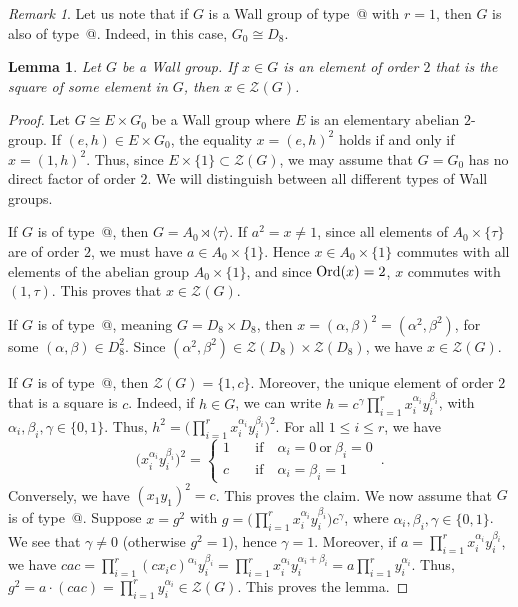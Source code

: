 \documentclass[12pt]{amsart}
\makeatletter
\numberwithin{equation}{section}
\newcommand*{\rom}[1]{\expandafter\@slowromancap\romannumeral #1@}
\newcommand{\Ord}{{\rm Ord}}
\newtheorem{lem}[X]{Lemma}
\theoremstyle{definition}
\theoremstyle{remark}
\newtheorem{rk}{Remark}[section]
\makeatother
\begin{document}
    \begin{rk}
        Let us note that if $G$ is a Wall group of type~\rom{4} with $r=1$, then $G$ is also of type~\rom{1}. Indeed, in this case, $G_0\cong D_8$.
    \end{rk}
    \begin{lem}\label{Wallcentralelement}
        Let $G$ be a Wall group. If $x\in G$ is an element of order $2$ that is the square of some element in $G$, then $x\in \mathcal{Z}(G)$.
    \end{lem}
    \begin{proof}
        Let $G\cong E\times G_0$ be a Wall group where $E$ is an elementary abelian $2$-group. If $(e,h)\in E\times G_0$, the equality $x=(e,h)^2$ holds if and only if $x=(1,h)^2$. Thus, since $E\times \{1\}\subset \mathcal{Z}(G)$, we may assume that $G=G_0$ has no direct factor of order $2$. We will distinguish between all different types of Wall groups.
        
        If $G$ is of type~\rom{1}, then $G=A_0\rtimes\langle \tau\rangle$. If $a^2=x\ne 1$, since all elements of $A_0\times\{\tau\}$ are of order $2$, we must have $a\in A_0\times\{1\}$. Hence $x\in A_0\times\{1\}$ commutes with all elements of the abelian group $A_0\times\{1\}$, and since $\Ord(x)=2$, $x$ commutes with $(1,\tau)$. This proves that $x\in \mathcal{Z}(G)$.
        
        If $G$ is of type~\rom{2}, meaning $G=D_8\times D_8$, then $x=(\alpha,\beta)^2=(\alpha^2,\beta^2)$, for some $(\alpha,\beta)\in D_8^2$. Since $(\alpha^2,\beta^2)\in \mathcal{Z}(D_8)\times\mathcal{Z}(D_8)$, we have $x\in \mathcal{Z}(G)$.
        
        If $G$ is of type~\rom{3}, then $\mathcal{Z}(G)=\{1,c\}$. Moreover, the unique element of order $2$ that is a square is $c$. Indeed, if $h\in G$, we can write $h=c^\gamma\prod_{i=1}^r x_i^{\alpha_i}y_i^{\beta_i}$, with $\alpha_i,\beta_i,\gamma\in \{0,1\}$. Thus, $h^2=\bigl(\prod_{i=1}^r x_i^{\alpha_i}y_i^{\beta_i}\bigr)^2$. For all $1\le i\le r$, we have \[\bigl(x_i^{\alpha_i} y_i^{\beta_i}\bigr)^2=\begin{cases}
            1\quad &\text{if}\quad \alpha_i=0\ \text{or}\ \beta_i=0\\
            c   &\text{if}\quad \alpha_i=\beta_i=1
        \end{cases}\, .\]
        Conversely, we have $(x_1y_1)^2=c$. This proves the claim. We now assume that $G$ is of type~\rom{4}. Suppose $x=g^2$ with $g=\bigl(\prod_{i=1}^r x_i^{\alpha_i}y_i^{\beta_i}\bigr)c^\gamma$, where $\alpha_i,\beta_i,\gamma\in \{0,1\}$. We see that $\gamma\ne 0$ (otherwise $g^2=1$), hence $\gamma=1$. Moreover, if $a=\prod_{i=1}^r x_i^{\alpha_i} y_i^{\beta_i}$, we have $cac=\prod_{i=1}^r (cx_ic)^{\alpha_i}y_i^{\beta_i}=\prod_{i=1}^r x_i^{\alpha_i}y_i^{\alpha_i+\beta_i}=a\prod_{i=1}^ry_i^{\alpha_i}$. Thus, $g^2=a\cdot(cac)=\prod_{i=1}^r y_i^{\alpha_i}\in \mathcal{Z}(G)$. This proves the lemma.
    \end{proof}
    
\end{document}

